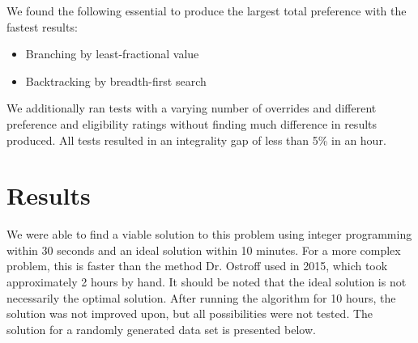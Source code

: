 \documentclass[11pt]{article}
\begin{document}
We found the following essential to produce the largest total preference with the fastest results:
\begin{itemize}
	\item Branching by least-fractional value
	\item Backtracking by breadth-first search
\end{itemize}
\indent We additionally ran tests with a varying number of overrides and different preference and eligibility ratings without finding much difference in results produced. All tests resulted in an integrality gap of less than 5\% in an hour.

\section{Results}
We were able to find a viable solution to this problem using integer programming within 30 seconds and an ideal solution within 10 minutes. For a more complex problem, this is faster than the method Dr. Ostroff used in 2015, which took approximately 2 hours by hand. It should be noted that the ideal solution is not necessarily the optimal solution. After running the algorithm for 10 hours, the solution was not improved upon, but all possibilities were not tested. The solution for a randomly generated data set is presented below.\\
\end{document}
